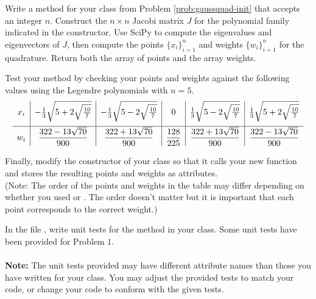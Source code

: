 
\begin{problem} %
\label{prob:jacobi}
Write a method for your class from Problem \ref{prob:gaussquad-init} that accepts an integer $n$.
Construct the $n\times n$ Jacobi matrix $J$ for the polynomial family indicated in the constructor.
Use SciPy to compute the eigenvalues and eigenvectors of $J$, then compute the points $\{x_i\}_{i=1}^n$ and weights $\{w_i\}_{i=1}^n$ for the quadrature.
Return both the array of points and the array weights.

Test your method by checking your points and weights against the following values using the Legendre polynomials with $n=5$.
{\small
\[
\centering
\begin{array}{c|c|c|c|c|c}
    x_i
    & -\frac{1}{3}\sqrt{5 + 2\sqrt{\frac{10}{7}}}
    & -\frac{1}{3}\sqrt{5 - 2\sqrt{\frac{10}{7}}}
    & 0
    & \frac{1}{3}\sqrt{5 - 2\sqrt{\frac{10}{7}}}
    & \frac{1}{3}\sqrt{5 + 2\sqrt{\frac{10}{7}}}
    \\[1em] \hline
    w_i
    & \dfrac{322-13\sqrt{70}}{900}
    & \dfrac{322+13\sqrt{70}}{900}
    & \dfrac{128}{225}
    & \dfrac{322+13\sqrt{70}}{900}
    & \dfrac{322-13\sqrt{70}}{900}
\end{array}
\]
}

Finally, modify the constructor of your class so that it calls your new function and stores the resulting points and weights as attributes.
\\(Note: The order of the points and weights in the table may differ depending on whether you used  or . The order doesn't matter but it is important that each point corresponds to the correct weight.)
\end{problem}

\begin{unittest}
In the file , write unit tests for the  method in your  class. Some unit tests have been provided for Problem $1$. \\ \\
\textbf{Note:} The unit tests provided may have different attribute names than those you have written for your class. You may adjust the provided tests to match your code, or change your code to conform with the given tests.
\end{unittest}

